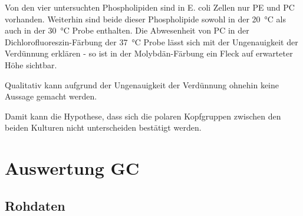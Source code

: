 \documentclass[a4paper,english]{scrreprt}
\begin{document}
Von den vier untersuchten Phospholipiden sind in E. coli Zellen nur PE und PC
vorhanden. Weiterhin sind beide dieser Phospholipide sowohl in der
\SI{20}{\celsius} als auch in der \SI{30}{\celsius} Probe enthalten. Die
Abwesenheit von PC in der Dichlorofluoreszin-Färbung der \SI{37}{\celsius}
Probe lässt sich mit der Ungenauigkeit der Verdünnung erklären - so ist in der
Molybdän-Färbung ein Fleck auf erwarteter Höhe sichtbar.

Qualitativ kann aufgrund der Ungenauigkeit der Verdünnung ohnehin keine Aussage
gemacht werden.

Damit kann die Hypothese, dass sich die polaren Kopfgruppen zwischen den beiden
Kulturen nicht unterscheiden bestätigt werden.

\chapter{Auswertung GC}

\section{Rohdaten}
\end{document}
